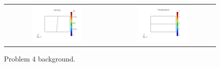 \documentclass[review]{elsarticle}
\begin{document}
\newcommand{\psize}{0.45}
\begin{figure}[tbh]
  \begin{center}
    \begin{tabular}{cc}
      \includegraphics[width=0.5\textwidth]{figs/density_p41D.png} &
      \includegraphics[width=0.5\textwidth]{figs/temperature_p41D.png}
    \end{tabular}
  \caption{
    Problem 4 background.
  }
  \end{center}
  \label{fig:p41D_rho_T}
\end{figure}
\end{document}
